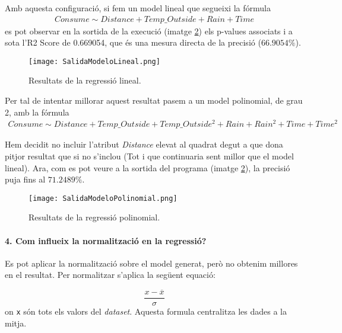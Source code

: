 \documentclass[a4paper, 11pt]{article}
\begin{document}
        Amb aquesta configuració, si fem un model lineal que segueixi la fórmula
        \begin{gather*}
          Consume \sim Distance + Temp\_Outside + Rain + Time
        \end{gather*}
        es pot observar en la sortida de la execució (imatge \ref{fig:R_L}) els p-values associats
        i a sota l'R2 Score de 0.669054, que és una mesura directa de la precisió ($66.9054\%$).

        \begin{figure}[H]
            \centering
            \texttt{[image: SalidaModeloLineal.png]}
            \caption{Resultats de la regressió lineal.}
            \label{fig:R_L}
        \end{figure}

        Per tal de intentar millorar aquest resultat pasem a un model polinomial, de grau 2, amb la
        fórmula
        \begin{gather*}
          Consume \sim Distance + Temp\_Outside + Temp\_Outside^2 + Rain + Rain^2 + Time + Time^2
        \end{gather*}

        Hem decidit no incluir l'atribut \textit{Distance} elevat al quadrat degut a que dona pitjor
        resultat que si no s'inclou (Tot i que continuaria sent millor que el model lineal). Ara,
        com es pot veure a la sortida del programa (imatge \ref{fig:R_L}), la precisió puja fins al
        $71.2489\%$.

        \begin{figure}[H]
            \centering
            \texttt{[image: SalidaModeloPolinomial.png]}
            \caption{Resultats de la regressió polinomial.}
            \label{fig:R_L}
        \end{figure}



        \paragraph{4. Com influeix la normalització en la regressió?}
        Es pot aplicar la normalització sobre el model generat, però no obtenim millores en el
        resultat. Per normalitzar s'aplica la següent equació:

        \begin{equation}
            \frac{x-\overline{x}}{\sigma}
        \end{equation}
        on \texttt{x} són tots els valors del \textit{dataset}. Aquesta formula centralitza les
        dades a la mitja.
\end{document}
